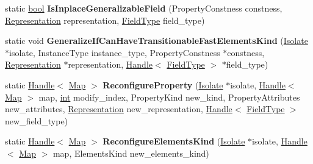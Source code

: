 \begin{DoxyCompactItemize}
\item 
\mbox{\label{classv8_1_1internal_1_1Map_a9df86d504f7d34a895d042a25f2a90be}} 
static \mbox{\hyperlink{classbool}{bool}} {\bfseries Is\+Inplace\+Generalizable\+Field} (Property\+Constness constness, \mbox{\hyperlink{classv8_1_1internal_1_1Representation}{Representation}} representation, \mbox{\hyperlink{classv8_1_1internal_1_1FieldType}{Field\+Type}} field\+\_\+type)
\item 
\mbox{\label{classv8_1_1internal_1_1Map_a9e918ae11d2d6962c1107aff7c902cea}} 
static void {\bfseries Generalize\+If\+Can\+Have\+Transitionable\+Fast\+Elements\+Kind} (\mbox{\hyperlink{classv8_1_1internal_1_1Isolate}{Isolate}} $\ast$isolate, Instance\+Type instance\+\_\+type, Property\+Constness $\ast$constness, \mbox{\hyperlink{classv8_1_1internal_1_1Representation}{Representation}} $\ast$representation, \mbox{\hyperlink{classv8_1_1internal_1_1Handle}{Handle}}$<$ \mbox{\hyperlink{classv8_1_1internal_1_1FieldType}{Field\+Type}} $>$ $\ast$field\+\_\+type)
\item 
\mbox{\label{classv8_1_1internal_1_1Map_a3c9f72773bf80838626563609e7c8de1}} 
static \mbox{\hyperlink{classv8_1_1internal_1_1Handle}{Handle}}$<$ \mbox{\hyperlink{classv8_1_1internal_1_1Map}{Map}} $>$ {\bfseries Reconfigure\+Property} (\mbox{\hyperlink{classv8_1_1internal_1_1Isolate}{Isolate}} $\ast$isolate, \mbox{\hyperlink{classv8_1_1internal_1_1Handle}{Handle}}$<$ \mbox{\hyperlink{classv8_1_1internal_1_1Map}{Map}} $>$ map, \mbox{\hyperlink{classint}{int}} modify\+\_\+index, Property\+Kind new\+\_\+kind, Property\+Attributes new\+\_\+attributes, \mbox{\hyperlink{classv8_1_1internal_1_1Representation}{Representation}} new\+\_\+representation, \mbox{\hyperlink{classv8_1_1internal_1_1Handle}{Handle}}$<$ \mbox{\hyperlink{classv8_1_1internal_1_1FieldType}{Field\+Type}} $>$ new\+\_\+field\+\_\+type)
\item 
\mbox{\label{classv8_1_1internal_1_1Map_a70de435bb100ffb827d7fdeea1240f89}} 
static \mbox{\hyperlink{classv8_1_1internal_1_1Handle}{Handle}}$<$ \mbox{\hyperlink{classv8_1_1internal_1_1Map}{Map}} $>$ {\bfseries Reconfigure\+Elements\+Kind} (\mbox{\hyperlink{classv8_1_1internal_1_1Isolate}{Isolate}} $\ast$isolate, \mbox{\hyperlink{classv8_1_1internal_1_1Handle}{Handle}}$<$ \mbox{\hyperlink{classv8_1_1internal_1_1Map}{Map}} $>$ map, Elements\+Kind new\+\_\+elements\+\_\+kind)

\end{DoxyCompactItemize}
